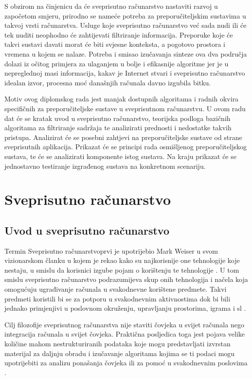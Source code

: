 \documentclass[times, utf8, diplomski, numeric]{fer}
\begin{document}
S obzirom na činjenicu da će sveprisutno računarstvo nastaviti razvoj u
započetom smjeru, prirodno se nameće potreba za preporučiteljskim sustavima u
takvoj vrsti računarstva. Usluge koje sveprisutno računarstvo već sada nudi ili
će tek nuditi neophodno će zahtijevati filtriranje informacija. Preporuke koje
će takvi sustavi davati morat će biti svjesne konteksta, a pogotovo prostora i
vremena u kojem se nalaze. Potreba i smisao izučavanja sinteze ova dva područja
dolazi iz očitog primjera za ulaganjem u bolje i efikasnije algoritme jer je u
nepreglednoj masi informacija, kakav je Internet stvari i sveprisutno
računarstvo idealan izvor, procesna moć današnjih računala davno izgubila
bitku.

Motiv ovog diplomskog rada jest manjak dostupnih algoritama i radnih okvira
specifičnih za preporučiteljske sustave u sveprisutnom računarstvu. U ovom radu
dat će se kratak uvod u sveprisutno računarstvo, teorijska podloga bazičnih
algoritama za filtriranje sadržaja te analizirati prednosti i nedostatke takvih
pristupa. Analizirat će se posebni zahtjevi na preporučiteljske sustave
od strane sveprisutnih aplikacija. Prikazat će se principi rada osmišljenog
preporučiteljskog sustava, te će se analizirati komponente istog sustava. Na
kraju prikazat će se jednostavno testiranje izgrađenog sustava na konkretnom
scenariju.

\chapter{Sveprisutno računarstvo}
\section{Uvod u sveprisutno računarstvo}

Termin \glqq Sveprisutno računarstvo\grqq prvi je upotrijebio Mark Weiser u
svom vizionarskom članku u kojem je rekao kako su najkorisnije
one tehnologije koje nestaju, u smislu da korisnici izgube pojam o
korištenju te tehnologije \cite{computer21}. U tom smislu sveprisutno
računarstvo podrazumijeva skup onih tehnologija i načela koja omogućuju
ugrađivanje računala u svakodnevne korištene predmete. Takvi predmeti koristili
bi se za potporu u svakodnevnim aktivnostima dok bi bili jednako primjenjivi u
poslovnom okruženju, upravljanju prostorima, igrama i sl \cite{Krumm2009}.

Cilj filozofije sveprisutnog računarstva nije staviti čovjeka u svijet računala
nego integracija računala u svijet čovjeka. Praktična posljedica toga jest
pojava velike količine mahom nestrukturiranih podataka koje mogu predstavljati
izvrstan materijal za daljnju obradu i izučavanje algoritama kojima se ti podaci
mogu upotrijebiti za analizu ponašanja čovjeka ili za pomoć u svakodnevnim
poslovima \cite{VukoticTankovic}.
\end{document}
